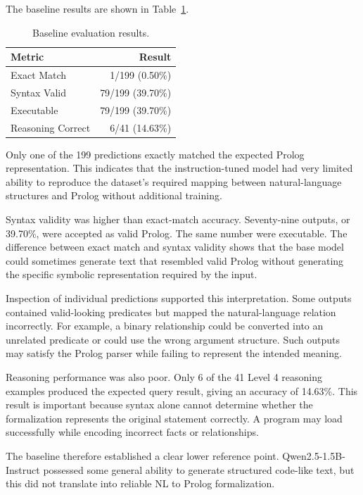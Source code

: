 \documentclass[11pt]{article} %
\theoremstyle{plain}
\theoremstyle{definition}
\begin{document}
The baseline results are shown in Table~\ref{tab:baseline-results}.

\begin{table}[ht]
\centering
\caption{Baseline evaluation results.}
\label{tab:baseline-results}
\begin{tabular}{lr}
\toprule
\textbf{Metric} & \textbf{Result} \\
\midrule
Exact Match       & 1/199 (0.50\%)   \\
Syntax Valid      & 79/199 (39.70\%) \\
Executable        & 79/199 (39.70\%) \\
Reasoning Correct & 6/41 (14.63\%)   \\
\bottomrule
\end{tabular}
\end{table}

Only one of the 199 predictions exactly matched the expected Prolog
representation. This indicates that the instruction-tuned model had very
limited ability to reproduce the dataset's required mapping between
natural-language structures and Prolog without additional training.

Syntax validity was higher than exact-match accuracy. Seventy-nine outputs, or
39.70\%, were accepted as valid Prolog. The same number were executable. The
difference between exact match and syntax validity shows that the base model
could sometimes generate text that resembled valid Prolog without generating
the specific symbolic representation required by the input.

Inspection of individual predictions supported this interpretation. Some
outputs contained valid-looking predicates but mapped the natural-language
relation incorrectly. For example, a binary relationship could be converted
into an unrelated predicate or could use the wrong argument structure. Such
outputs may satisfy the Prolog parser while failing to represent the intended
meaning.

Reasoning performance was also poor. Only 6 of the 41 Level 4 reasoning
examples produced the expected query result, giving an accuracy of 14.63\%.
This result is important because syntax alone cannot determine whether the
formalization represents the original statement correctly. A program may load
successfully while encoding incorrect facts or relationships.

The baseline therefore established a clear lower reference point.
Qwen2.5-1.5B-Instruct possessed some general ability to generate structured
code-like text, but this did not translate into reliable NL to Prolog
formalization.
\end{document}

